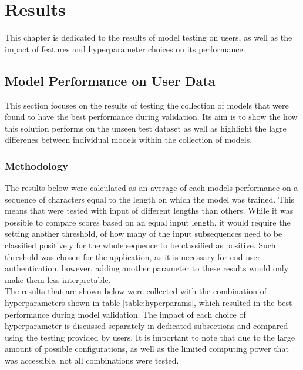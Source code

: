 
\chapter{Results}
This chapter is dedicated to the results of model testing on users, as well as the impact of features and hyperparameter choices on its performance. 

\section{Model Performance on User Data}
This section focuses on the results of testing the collection of models that were found to have the best performance during validation. Its aim is to show the how this solution performs on the unseen test dataset as well as highlight the lagre differenes between individual models within the collection of models.

\subsection{Methodology}
The results below were calculated as an average of each models performance on a sequence of characters equal to the length on which the model was trained.
This means that were tested with input of different lengths than others. 
While it was possible to compare scores based on an equal input length,
it would require the setting another threshold, of how many of the input subsequences need to be classified positively for the whole sequence to be classified as positive. 
Such threshold was chosen for the application, as it is necessary for end user authentication, however, adding another parameter to these results would only make them less interpretable.\\
The results that are shown below were collected with the combination of hyperparameters shown in table \ref{table:hyperparams}, which resulted in the best performance during model validation. The impact of each choice of hyperparameter is discussed separately in dedicated subsections and compared using the testing provided by users. It is important to note that due to the large amount of possible configurations, as well as the limited computing power that was accessible, not all combinations were tested.

